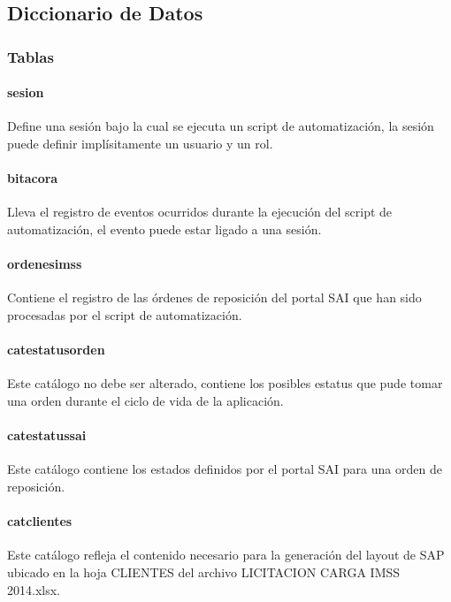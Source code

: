 \subsection{Diccionario de Datos}
\subsubsection{Tablas}
\paragraph*{sesion} Define una sesión bajo la cual se ejecuta un script de automatización, la sesión puede definir implísitamente un usuario y un rol.

\paragraph*{bitacora} Lleva el registro de eventos ocurridos durante la ejecución del script de automatización, el evento puede estar ligado a una sesión.

\paragraph*{ordenes{\textunderscore}imss} Contiene el registro de las órdenes de reposición del portal SAI que han sido procesadas por el script de automatización.

\paragraph*{cat{\textunderscore}estatus{\textunderscore}orden} Este catálogo no debe ser alterado, contiene los posibles estatus que pude tomar una orden durante el ciclo de vida de la aplicación.

\paragraph*{cat{\textunderscore}estatus{\textunderscore}sai} Este catálogo contiene los estados definidos por el portal SAI para una orden de reposición.

\paragraph*{cat{\textunderscore}clientes} Este catálogo refleja el contenido necesario para la generación del layout de SAP ubicado en la hoja CLIENTES del archivo LICITACION  CARGA IMSS 2014.xlsx.

